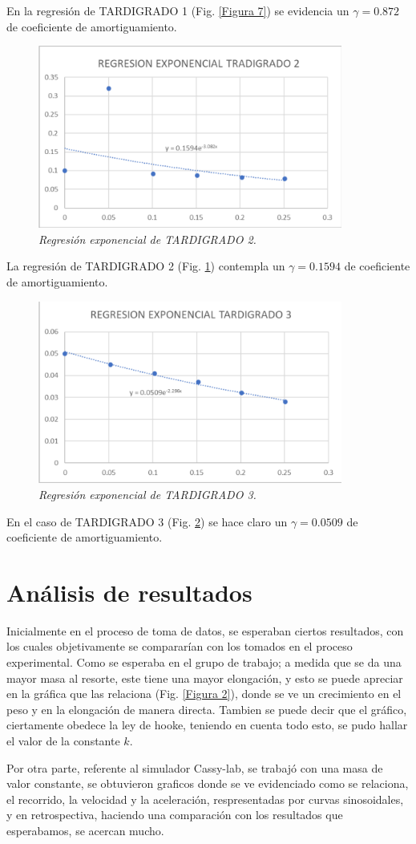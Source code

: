 \documentclass[spanish,notitlepage,letterpaper, 12pt]{article}
\begin{document}
\bigskip
En la regresión de TARDIGRADO 1 (Fig. \ref{Figura 7}) se evidencia un $\gamma=0.872$ de coeficiente de amortiguamiento.
\newpage
\begin{figure}[ht]
    \centering
    \includegraphics[width=10.0cm]{images/regresion-tardigrado2.png}
    \caption{\textit{Regresión exponencial de TARDIGRADO 2.}}
    \label{Figura 8}
\end{figure}
La regresión de TARDIGRADO 2 (Fig. \ref{Figura 8}) contempla un $\gamma=0.1594$ de coeficiente de amortiguamiento.
\begin{figure}[ht]
    \centering
    \includegraphics[width=10.0cm]{images/regresion-tardigrado3.png}
    \caption{\textit{Regresión exponencial de TARDIGRADO 3.}}
    \label{Figura 9}
\end{figure}
\bigskip
En el caso de TARDIGRADO 3 (Fig. \ref{Figura 9}) se hace claro un $\gamma=0.0509$ de coeficiente de amortiguamiento.
\section{Análisis de resultados}
Inicialmente en el proceso de toma de datos, se esperaban ciertos resultados, con los cuales objetivamente se compararían con los tomados en el proceso experimental. Como se esperaba en el grupo de trabajo; a medida que se da una mayor masa al resorte, este tiene una mayor elongación, y esto se
puede apreciar en la gráfica que las relaciona (Fig. \ref{Figura 2}), donde se ve un crecimiento en el peso y en la elongación de manera directa. Tambien se puede decir que el gráfico, ciertamente obedece la ley de hooke, teniendo en cuenta todo esto, se pudo hallar el valor de la constante $k$.\par
\bigskip
Por otra parte, referente al simulador Cassy-lab, se trabajó con una masa de valor constante, se obtuvieron graficos donde se ve evidenciado como se relaciona, el recorrido, la velocidad y la aceleración, respresentadas por curvas sinosoidales, y en retrospectiva, haciendo una comparación con los resultados que esperabamos, se acercan mucho.
\end{document}
